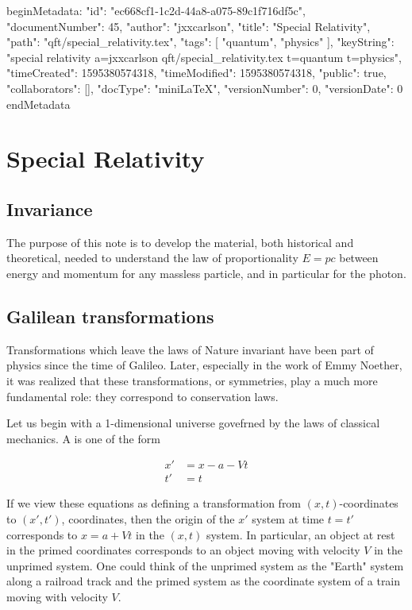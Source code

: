beginMetadata:
{
    "id": "ec668cf1-1c2d-44a8-a075-89c1f716df5c",
    "documentNumber": 45,
    "author": "jxxcarlson",
    "title": "Special Relativity",
    "path": "qft/special_relativity.tex",
    "tags": [
        "quantum",
        "physics"
    ],
    "keyString": "special relativity a=jxxcarlson qft/special_relativity.tex t=quantum t=physics",
    "timeCreated": 1595380574318,
    "timeModified": 1595380574318,
    "public": true,
    "collaborators": [],
    "docType": "miniLaTeX",
    "versionNumber": 0,
    "versionDate": 0
}
endMetadata


\setcounter{section}{13}


\section{Special Relativity}

\innertableofcontents

\subsection{Invariance}

The purpose of this note is to develop the material,
both historical and theoretical, needed to understand
the law of proportionality $E = pc$ between energy
and momentum for any massless particle, and in particular
for the photon.

\subsection{Galilean transformations}

Transformations which leave the laws of Nature
invariant have been part of physics since the time
of Galileo.  Later, especially in the work of Emmy Noether,
it was realized that these transformations,
or symmetries, play a much more fundamental role: they
correspond to conservation laws.

Let us begin with a 1-dimensional universe govefrned
by  the laws of classical mechanics.  A 
is one of the form

\begin{align}
  x' &= x - a - Vt \\
  t' &= t
\end{align}

If we view these equations as defining a transformation
from $(x,t)$-coordinates to $(x',t')$, coordinates, then the
origin of the $x'$ system at time $t = t'$ corresponds to
$x = a + Vt$ in the $(x,t)$ system.  In particular, an object
at rest in the primed coordinates corresponds to an object
moving with velocity $V$ in the unprimed system.  One
could think of the unprimed system as the "Earth" system
along a railroad track and the primed system as the 
coordinate system of a train moving with velocity $V$.

